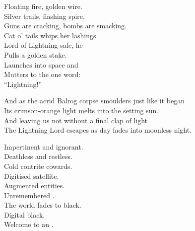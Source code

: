 Floating fire, golden wire. \\
Silver trails, flashing spire. \\
Guns are cracking, bombs are smacking. \\
Cat o' tails whips her lashings. \\

Lord of Lightning safe, he \\
Pulls a golden stake. \\
Launches into space and \\
Mutters to the  one word: \\

``Lightning!'' \\





And as the acrid Balrog corpse smoulders just like it began \\
Its crimson-orange light melts into the setting sun. \\

And leaving us not without a final clap of light \\
The Lightning Lord escapes as day fades into moonless night. \\





Impertinent and ignorant. \\
Deathless and restless. \\
Cold contrite cowards. \\

Digitised satellite. \\
Augmented entities. \\
Unremembered . \\

The world fades to black. \\
Digital black. \\

Welcome to an . \\

